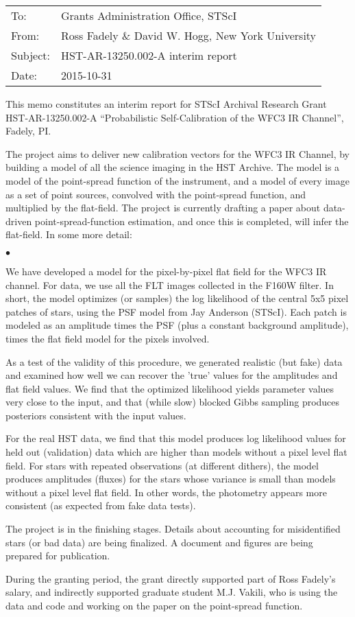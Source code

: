 \documentclass[12pt,letterpaper]{article}
\renewenvironment{itemize}{\begin{list}{$\bullet$}{%
  \setlength{\topsep}{0.5ex}%
  \setlength{\parsep}{0.0ex}%
  \setlength{\partopsep}{0.0ex}%
  \setlength{\itemsep}{0.5ex}%
  \setlength{\leftmargin}{1.5\parindent}}}{\end{list}}
\begin{document}
\thispagestyle{empty}
\noindent
\begin{tabular}{@{\textbf}ll}
To:      & Grants Administration Office, STScI \\[1ex]
From:    & Ross Fadely \& David W. Hogg, New York University \\[1ex]
Subject: & HST-AR-13250.002-A interim report \\[1ex]
Date:    & 2015-10-31 \\[1ex]
\end{tabular}
\bigskip

\noindent
This memo constitutes an interim report for STScI Archival Research
Grant HST-AR-13250.002-A ``Probabilistic Self-Calibration of the WFC3
IR Channel'', Fadely, PI.

The project aims to deliver new calibration vectors for the WFC3 IR
Channel, by building a model of all the science imaging in the HST
Archive.  The model is a model of the point-spread function of the
instrument, and a model of every image as a set of point sources,
convolved with the point-spread function, and multiplied by the
flat-field.  The project is currently drafting a paper about
data-driven point-spread-function estimation, and once this is
completed, will infer the flat-field.  In some more detail:
\begin{itemize}
\item
We have developed a model for the pixel-by-pixel flat field for the
WFC3 IR channel.  For data, we use all the FLT images collected in the
F160W filter.  In short, the model optimizes (or samples) the log
likelihood of the central 5x5 pixel patches of stars, using the PSF
model from Jay Anderson (STScI).  Each patch is modeled as an amplitude times
the PSF (plus a constant background amplitude), times the flat field
model for the pixels involved.
\item
As a test of the validity of this procedure, we generated realistic
(but fake) data and examined how well we can recover the 'true' values
for the amplitudes and flat field values.  We find that the optimized
likelihood yields parameter values very close to the input, and that
(while slow) blocked Gibbs sampling produces posteriors consistent
with the input values.
\item
For the real HST data, we find that this model produces log likelihood
values for held out (validation) data which are higher than models
without a pixel level flat field.  For stars with repeated
observations (at different dithers), the model produces amplitudes
(fluxes) for the stars whose variance is small than models without a
pixel level flat field.  In other words, the photometry appears more
consistent (as expected from fake data tests).
\item
The project is in the finishing stages.  Details about accounting for
misidentified stars (or bad data) are being finalized.  A document and
figures are being prepared for publication.
\end{itemize}

During the granting period, the grant directly supported part of Ross
Fadely's salary, and indirectly supported graduate student
M.J. Vakili, who is using the data and code and working on the paper
on the point-spread function.
\end{document}
